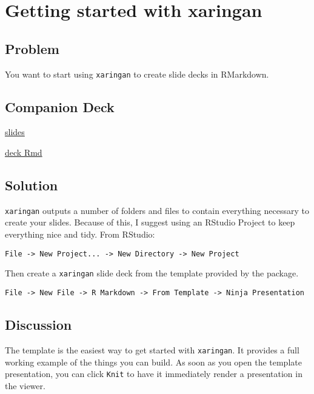 \documentclass[]{book}
\theoremstyle{definition}
\theoremstyle{definition}
\theoremstyle{definition}
\theoremstyle{remark}
\begin{document}
\hypertarget{getting-started-with-xaringan}{%
\chapter{Getting started with
xaringan}\label{getting-started-with-xaringan}}

\hypertarget{problem-1}{%
\section{Problem}\label{problem-1}}

You want to start using \texttt{xaringan} to create slide decks in
RMarkdown.

\hypertarget{companion-deck-1}{%
\section{Companion Deck}\label{companion-deck-1}}

\href{http://xaringan-field-guide-companion.davisvaughan.com/02-getting-started/getting-started.html\#1}{slides}

\href{https://github.com/DavisVaughan/xaringanrecipes-companion/tree/master/02-getting-started}{deck
Rmd}

\hypertarget{solution-1}{%
\section{Solution}\label{solution-1}}

\texttt{xaringan} outputs a number of folders and files to contain
everything necessary to create your slides. Because of this, I suggest
using an RStudio Project to keep everything nice and tidy. From RStudio:

\texttt{File\ -\textgreater{}\ New\ Project...\ -\textgreater{}\ New\ Directory\ -\textgreater{}\ New\ Project}

Then create a \texttt{xaringan} slide deck from the template provided by
the package.

\texttt{File\ -\textgreater{}\ New\ File\ -\textgreater{}\ R\ Markdown\ -\textgreater{}\ From\ Template\ -\textgreater{}\ Ninja\ Presentation}

\hypertarget{discussion-1}{%
\section{Discussion}\label{discussion-1}}

The template is the easiest way to get started with \texttt{xaringan}.
It provides a full working example of the things you can build. As soon
as you open the template presentation, you can click \texttt{Knit} to
have it immediately render a presentation in the viewer.
\end{document}
